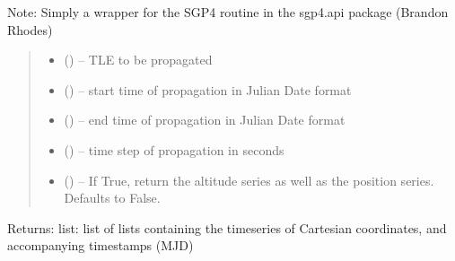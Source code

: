 \documentclass[letterpaper,10pt,english]{sphinxmanual}
\begin{document}
\begin{fulllineitems}
\label{\detokenize{fspsim.utils:fspsim.utils.Propagators.sgp4_prop_TLE}}
\pysigstartsignatures
{}
\pysigstopsignatures\begin{description}
\sphinxAtStartPar
Note: Simply a wrapper for the SGP4 routine in the sgp4.api package (Brandon Rhodes)

\end{description}
\begin{quote}\begin{description}
\begin{itemize}
\item {} 
\sphinxAtStartPar
{} () – TLE to be propagated

\item {} 
\sphinxAtStartPar
{} () – start time of propagation in Julian Date format

\item {} 
\sphinxAtStartPar
{} () – end time of propagation in Julian Date format

\item {} 
\sphinxAtStartPar
{} () – time step of propagation in seconds

\item {} 
\sphinxAtStartPar
{} (\sphinxstyleliteralemphasis{\sphinxupquote{, }}) – If True, return the altitude series as well as the position series. Defaults to False.

\end{itemize}

\end{description}\end{quote}

\sphinxAtStartPar
Returns:
list: list of lists containing the time\sphinxhyphen{}series of Cartesian coordinates, and accompanying time\sphinxhyphen{}stamps (MJD)

\end{fulllineitems}
\end{document}
